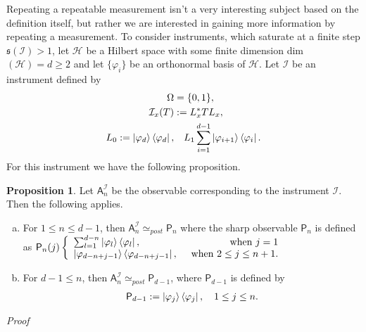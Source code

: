 \documentclass[a4paper,12pt]{wihuri}
\theoremstyle{definition}
\newtheorem{proposition}{Proposition}
\numberwithin{definition}{section}
\numberwithin{example}{section}
\numberwithin{theorem}{section}
\numberwithin{proposition}{section}
\numberwithin{lemma}{section}
\newcommand{\I}{\mathcal{I}}%
\newcommand{\hi}{\mathcal{H}}%
\newcommand{\A}{\mathsf{A}}%
\newcommand{\p}{\mathsf{P}}%
\newcommand{\sat}{\mathfrak{s}}
\newcommand{\spp}{\simeq_{post}}
\begin{document}
Repeating a repeatable measurement isn't a very interesting subject based on the definition itself, but rather we are interested in gaining more information by repeating a measurement. To consider instruments, which saturate at a finite step $\sat(\I) > 1$, let $\hi$ be a Hilbert space with some finite dimension dim$(\hi) = d \geq 2$ and let $\{ \varphi_i\}$ be an orthonormal basis of $\hi$. Let $\I$ be an instrument defined by 
\begin{align*}
\Omega &= \{0,1\},\\
\I_x(T) &:= L_x^*TL_x,\\
L_0 := \ket{\varphi_d}\bra{\varphi_d},&\quad L_1\sum_{i=1}^{d-1}\ket{\varphi_{i+1}}\bra{\varphi_i}\text.
\end{align*}
For this instrument we have the following proposition.
\begin{proposition}
Let $\A_n^\I$ be the observable corresponding to the instrument $\I$. Then the following applies. 
\begin{enumerate}[a)]
\item For $1 \leq n \leq d-1$, then $\A_n^\I \spp \p_n$ where the sharp observable $\p_n$ is defined as
$\p_n(j)\left\{\begin{array}{r}
\sum_{l=1}^{d-n}\ket{\varphi_l}\bra{\varphi_l}, \hfill \quad \text{ when } j=1 \\
\ket{\varphi_{d-n+j-1}}\bra{\varphi_{d-n+j-1}},\quad \text{ when } 2 \leq j \leq n+1\text.
\end{array} \right.$

\item For $d-1 \leq n$, then $\A_n^\I \spp \p_{d-1}$, where $\p_{d-1}$ is defined by
\begin{align*}
\p_{d-1} := \ket{\varphi_j}\bra{\varphi_j}, \quad 1 \leq j \leq n\text.
\end{align*}
\end{enumerate}
\end{proposition}
\noindent \textit{Proof}
\end{document}
